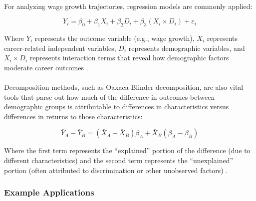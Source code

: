 \documentclass[../main.tex]{subfiles}
\begin{document}
\paragraph{} For analyzing wage growth trajectories, regression models are commonly applied:

\begin{equation}
Y_i = \beta_0 + \beta_1 X_i + \beta_2 D_i + \beta_3 (X_i \times D_i) + \varepsilon_i
\end{equation}

Where $Y_i$ represents the outcome variable (e.g., wage growth), $X_i$ represents career-related independent variables, $D_i$ represents demographic variables, and $X_i \times D_i$ represents interaction terms that reveal how demographic factors moderate career outcomes \citep{dol2023building, baker2023demographic}.

\paragraph{} Decomposition methods, such as Oaxaca-Blinder decomposition, are also vital tools that parse out how much of the difference in outcomes between demographic groups is attributable to differences in characteristics versus differences in returns to those characteristics:

\begin{equation}
\bar{Y}_A - \bar{Y}_B = (\bar{X}_A - \bar{X}_B)\beta_A + \bar{X}_B(\beta_A - \beta_B)
\end{equation}

Where the first term represents the ``explained'' portion of the difference (due to different characteristics) and the second term represents the ``unexplained'' portion (often attributed to discrimination or other unobserved factors) \citep{dol2023building, baker2023demographic}.

\subsubsection{Example Applications}
\end{document}
